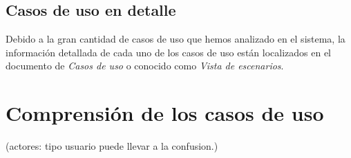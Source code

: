 \subsection{Casos de uso en detalle}
Debido a la gran cantidad de casos de uso que hemos analizado en el sistema, la informaci\'on detallada de cada uno de los casos de uso est\'an localizados en el documento de \textit{Casos de uso} o conocido como \textit{Vista de escenarios}.
\section{Comprensi\'on de los casos de uso}
(actores: tipo usuario puede llevar a la confusion.)